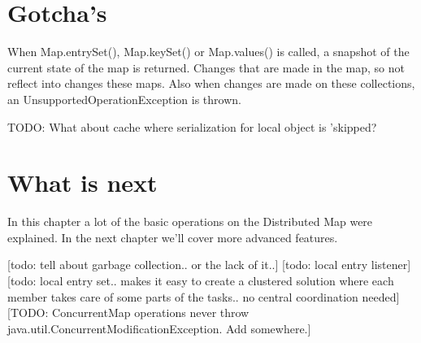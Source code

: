 \section{Gotcha's}
When Map.entrySet(), Map.keySet() or Map.values() is called, a snapshot of the current state of the map is returned. Changes that are made in the map, so not reflect into changes these maps. Also when changes are made on these collections, an UnsupportedOperationException is thrown.

TODO: What about cache where serialization for local object is 'skipped?

\section{What is next}
In this chapter a lot of the basic operations on the Distributed Map were explained. In the next chapter we'll cover more advanced features.

[todo: tell about garbage collection.. or the lack of it..]
[todo: local entry listener]
[todo: local entry set.. makes it easy to create a clustered solution where each member takes care of some parts of the tasks.. no central coordination needed]
[TODO: ConcurrentMap operations never throw java.util.ConcurrentModificationException. Add somewhere.]


